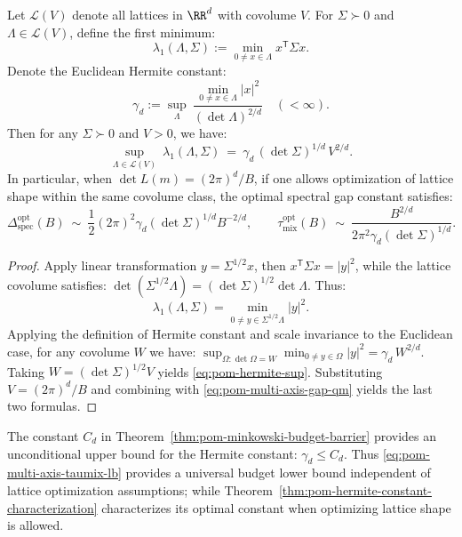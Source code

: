 \begin{theorem}\label{thm:pom-hermite-constant-characterization}
Let $\mathcal{L}(V)$ denote all lattices in $\RR^d$ with covolume $V$.
For $\Sigma\succ 0$ and $\Lambda\in\mathcal{L}(V)$, define the first minimum:
\[
\lambda_1(\Lambda,\Sigma):=\min_{0\neq x\in\Lambda}x^{\mathsf T}\Sigma x.
\]
Denote the Euclidean Hermite constant:
\[
\gamma_d:=\sup_{\Lambda}\ \frac{\min_{0\neq x\in\Lambda}|x|^{2}}{(\det\Lambda)^{2/d}}\quad(<\infty).
\]
Then for any $\Sigma\succ 0$ and $V>0$, we have:
\begin{equation}\label{eq:pom-hermite-sup}
\sup_{\Lambda\in\mathcal{L}(V)}\ \lambda_1(\Lambda,\Sigma)
\ =\ \gamma_d\,(\det\Sigma)^{1/d}\,V^{2/d}.
\end{equation}
In particular, when $\det L(m)=(2\pi)^d/B$, if one allows optimization of lattice shape within the same covolume class, the optimal spectral gap constant satisfies:
\[
\Delta_{\mathrm{spec}}^{\mathrm{opt}}(B)\ \sim\ \frac12(2\pi)^2\gamma_d(\det\Sigma)^{1/d}B^{-2/d},
\qquad
\tau_{\mathrm{mix}}^{\mathrm{opt}}(B)\ \sim\ \frac{B^{2/d}}{2\pi^2\gamma_d(\det\Sigma)^{1/d}}.
\]
\end{theorem}

\begin{proof}
Apply linear transformation $y=\Sigma^{1/2}x$, then $x^{\mathsf T}\Sigma x=|y|^2$, while the lattice covolume satisfies:
\(
\det(\Sigma^{1/2}\Lambda)=(\det\Sigma)^{1/2}\det\Lambda
\).
Thus:
\[
\lambda_1(\Lambda,\Sigma)
=\min_{0\neq y\in\Sigma^{1/2}\Lambda}|y|^2.
\]
Applying the definition of Hermite constant and scale invariance to the Euclidean case, for any covolume $W$ we have:
\(
\sup_{\Omega:\det\Omega=W}\min_{0\neq y\in\Omega}|y|^2=\gamma_d\,W^{2/d}
\).
Taking $W=(\det\Sigma)^{1/2}V$ yields \eqref{eq:pom-hermite-sup}.
Substituting $V=(2\pi)^d/B$ and combining with \eqref{eq:pom-multi-axis-gap-qm} yields the last two formulas.
\end{proof}

\begin{remark}\label{rem:pom-minkowski-vs-hermite}
The constant $C_d$ in Theorem~\ref{thm:pom-minkowski-budget-barrier} provides an unconditional upper bound for the Hermite constant: $\gamma_d\le C_d$.
Thus \eqref{eq:pom-multi-axis-taumix-lb} provides a universal budget lower bound independent of lattice optimization assumptions; while Theorem~\ref{thm:pom-hermite-constant-characterization} characterizes its optimal constant when optimizing lattice shape is allowed.
\end{remark}

